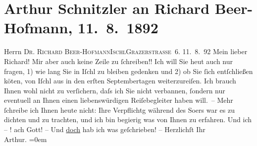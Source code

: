 

         
         \renewcommand{\erwaehntePersonen}{Personen: Richard Beer-Hofmann}
         \renewcommand{\erwaehnteOrte}{Orte: Bad Ischl, Grazer Straße, Wien}
         \renewcommand{\erwaehnteWerke}{}
               \section[Arthur Schnitzler an Richard Beer-Hofmann, 11. 8. 1892]{ Arthur Schnitzler an Richard Beer-Hofmann, 11. 8. 1892}\nopagebreak{}\rehead{ }\begin{ledgroupsized}[t]{13cm}\normalsize\beginnumbering \toendnotes[C]{\smallbreak\pagebreak[2]} 
\pstart{}{\pb}Herrn \textsc{Dr. Richard
                     Beer-Hofmann}\pend{}\pstart{}\textsc{Ischl}\pend{}\pstart{}\textsc{Grazerstraße 6}.\pend{}{\bigskip}\pstart
           \raggedleft{}{\pb}11. 8. 92\pend
           \pstart
           Mein lieber Richard! Mir aber auch keine Zeile zu ſchreiben!! Ich
               will Sie heut auch nur fragen, 1) wie lang Sie in Iſchl zu bleiben gedenken und 2) ob Sie ſich entſchließen kö{\geminationn}ten, von Iſchl aus in
               den erſten Septembertagen weiterzureiſen. Ich brauch Ihnen wohl nicht zu verſichern,
               daſs ich Sie nicht verbannen, ſondern nur eventuell \introOben{}an Ihnen\introOben{}
               einen liebenswürdigen Reiſebegleiter haben will. –\pend
           \pstart
           Mehr ſchreibe ich Ihnen heute nicht: Ihre Verpflichtg während des So{\geminationm}ers war es zu dichten und zu trachten, und ich bin
               begierig was von Ihnen zu erfahren. Und ich – ! ach Gott! – Und \uline{doch} hab ich was geſchrieben! –\pend
           \pstart
           Herzlichſt Ihr{\\[\baselineskip]}\spacefill\mbox{Arthur.}\pend
           \leftskip=0em{}
         
         \endnumbering{}\end{ledgroupsized}  \newcommand{\dateiname}{L00113}\newcommand{\titel}{Arthur Schnitzler an Richard Beer-Hofmann, 11. 8. 1892}\newcommand{\editorInnen}{Martin Anton Müller und Gerd-Hermann Susen}
      